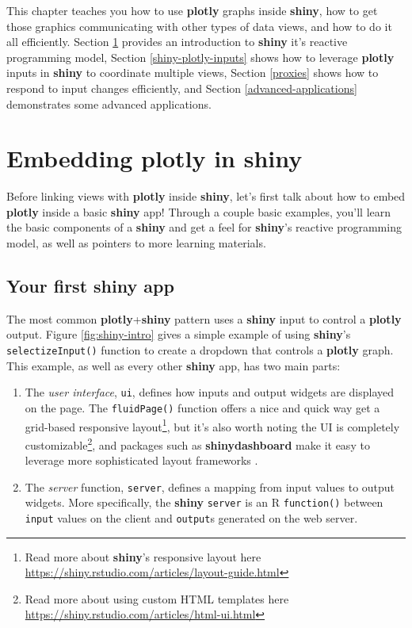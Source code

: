 \documentclass[
  12pt,
]{krantz}
\makeatletter
\providecommand{\tightlist}{%
  \setlength{\itemsep}{0pt}\setlength{\parskip}{0pt}}
\newcommand{\indexc}[1]{\index{#1@\texttt{#1}}}
\makeatother
\begin{document}
This chapter teaches you how to use \textbf{plotly} graphs inside \textbf{shiny}, how to get those graphics communicating with other types of data views, and how to do it all efficiently. Section \ref{hello-shiny} provides an introduction to \textbf{shiny} it's reactive programming model, Section \ref{shiny-plotly-inputs} shows how to leverage \textbf{plotly} inputs in \textbf{shiny} to coordinate multiple views, Section \ref{proxies} shows how to respond to input changes efficiently, and Section \ref{advanced-applications} demonstrates some advanced applications.

\hypertarget{hello-shiny}{%
\section{Embedding plotly in shiny}\label{hello-shiny}}

Before linking views with \textbf{plotly} inside \textbf{shiny}, let's first talk about how to embed \textbf{plotly} inside a basic \textbf{shiny} app! Through a couple basic examples, you'll learn the basic components of a \textbf{shiny} and get a feel for \textbf{shiny}'s reactive programming model, as well as pointers to more learning materials.

\hypertarget{your-first-shiny-app}{%
\subsection{Your first shiny app}\label{your-first-shiny-app}}

\indexc{renderPlotly()}

The most common \textbf{plotly}+\textbf{shiny} pattern uses a \textbf{shiny} input to control a \textbf{plotly} output. Figure \ref{fig:shiny-intro} gives a simple example of using \textbf{shiny}'s \texttt{selectizeInput()} function to create a dropdown that controls a \textbf{plotly} graph. This example, as well as every other \textbf{shiny} app, has two main parts:

\begin{enumerate}
\def\labelenumi{\arabic{enumi}.}
\tightlist
\item
  The \emph{user interface}, \texttt{ui}, defines how inputs and output widgets are displayed on the page. The \texttt{fluidPage()} function offers a nice and quick way get a grid-based responsive layout\footnote{Read more about \textbf{shiny}'s responsive layout here \url{https://shiny.rstudio.com/articles/layout-guide.html}}, but it's also worth noting the UI is completely customizable\footnote{Read more about using custom HTML templates here \url{https://shiny.rstudio.com/articles/html-ui.html}}, and packages such as \textbf{shinydashboard} make it easy to leverage more sophisticated layout frameworks \citep{shinydashboard}.
\item
  The \emph{server} function, \texttt{server}, defines a mapping from input values to output widgets. More specifically, the \textbf{shiny} \texttt{server} is an R \texttt{function()} between \texttt{input} values on the client and \texttt{output}s generated on the web server.
\end{enumerate}
\end{document}
